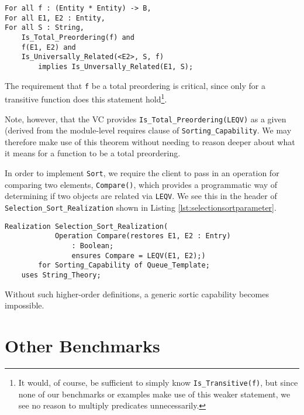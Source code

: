\begin{lstlisting}[float=h,language=resolve,caption={A Useful \texttt{Is\_Universally\_Related} theorem\label{lst:universallyrelatedtheorem}}]
For all f : (Entity * Entity) -> B,
For all E1, E2 : Entity,
For all S : String,
	Is_Total_Preordering(f) and
	f(E1, E2) and
	Is_Universally_Related(<E2>, S, f)
		implies Is_Unversally_Related(E1, S);
\end{lstlisting}

The requirement that \texttt{f} be a total preordering is critical, since only for a transitive function does this statement hold\footnote{It would, of course, be sufficient to simply know \texttt{Is\_Transitive(f)}, but since none of our benchmarks or examples make use of this weaker statement, we see no reason to multiply predicates unnecessarily.}.

Note, however, that the VC provides \texttt{Is\_Total\_Preordering(LEQV)} as a given (derived from the module-level requires clause of \texttt{Sorting\_Capability}.  We may therefore make use of this theorem without needing to reason deeper about what it means for a function to be a total preordering.

In order to implement \texttt{Sort}, we require the client to pass in an operation for comparing two elements, \texttt{Compare()}, which provides a programmatic way of determining if two objects are related via \texttt{LEQV}.  We see this in the header of \texttt{Selection\_Sort\_Realization} shown in Listing \ref{lst:selectionsortparameter}.

\begin{lstlisting}[float=h,language=resolve,caption={\texttt{Selection\_Sort\_Realization} taking an operation that implements \texttt{LEQV}\label{lst:selectionsortparameter}}]
Realization Selection_Sort_Realization(
			Operation Compare(restores E1, E2 : Entry) 
				: Boolean;
				ensures Compare = LEQV(E1, E2);)
		for Sorting_Capability of Queue_Template;
	uses String_Theory;
\end{lstlisting}

Without such higher-order definitions, a generic sortic capability becomes impossible.


\section{Other Benchmarks}

